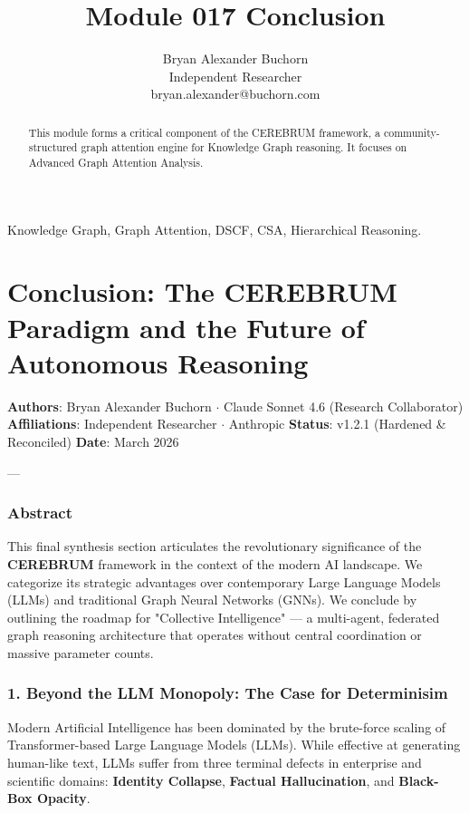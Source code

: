 \documentclass[10pt,journal,compsoc]{IEEEtran}
\begin{document}
\title{Module 017 Conclusion}
\author{Bryan Alexander Buchorn \\ Independent Researcher \\ bryan.alexander@buchorn.com}

\maketitle

\begin{abstract}
This module forms a critical component of the CEREBRUM framework, a community-structured graph attention engine for Knowledge Graph reasoning. It focuses on Advanced Graph Attention Analysis.
\end{abstract}

\begin{IEEEkeywords}
Knowledge Graph, Graph Attention, DSCF, CSA, Hierarchical Reasoning.
\end{IEEEkeywords}

\section{Conclusion: The CEREBRUM Paradigm and the Future of Autonomous Reasoning}

\textbf{Authors}: Bryan Alexander Buchorn $\cdot$ Claude Sonnet 4.6 (Research Collab\-orator)  
\textbf{Affili\-ations}: Independent Researcher $\cdot$ Anthropic  
\textbf{Status}: v1.2.1 (Hardened \& Reconciled)  
\textbf{Date}: March 2026

---

\subsubsection{Abstract}
This final synthesis section articulates the revol\-utionary signi\-ficance of the \textbf{CEREBRUM} framework in the context of the modern AI landscape. We categorize its strategic advantages over conte\-mporary Large Language Models (LLMs) and traditional Graph Neural Networks (GNNs). We conclude by outlining the roadmap for "Collective Intell\-igence" — a multi-agent, federated graph reasoning archi\-tecture that operates without central coord\-ination or massive parameter counts.

\subsubsection{1. Beyond the LLM Monopoly: The Case for Determ\-inisim}
Modern Artificial Intell\-igence has been dominated by the brute-force scaling of Transformer-based Large Language Models (LLMs). While effective at generating human-like text, LLMs suffer from three terminal defects in enterprise and scientific domains: \textbf{Identity Collapse}, \textbf{Factual Halluc\-ination}, and \textbf{Black-Box Opacity}. 
\end{document}
